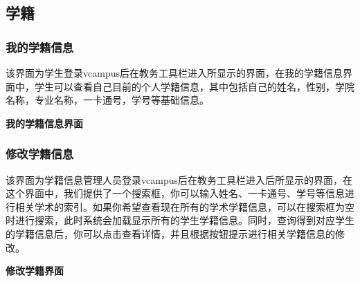 \documentclass{article}
\begin{document}
\subsection{学籍}

\subsubsection{我的学籍信息}
该界面为学生登录vcampus后在教务工具栏进入所显示的界面，在我的学籍信息界面中，学生可以查看自己目前的个人学籍信息，其中包括自己的姓名，性别，学院名称，专业名称，一卡通号，学号等基础信息。

\begin{center}
\textbf{我的学籍信息界面}
\end{center}

\subsubsection{修改学籍信息}
该界面为学籍信息管理人员登录vcampus后在教务工具栏进入后所显示的界面，在这个界面中，我们提供了一个搜索框，你可以输入姓名、一卡通号、学号等信息进行相关学术的索引。如果你希望查看现在所有的学术学籍信息，可以在搜索框为空时进行搜索，此时系统会加载显示所有的学生学籍信息。同时，查询得到对应学生的学籍信息后，你可以点击查看详情，并且根据按钮提示进行相关学籍信息的修改。
\begin{center}
\textbf{修改学籍界面}
\end{center}
\end{document}
